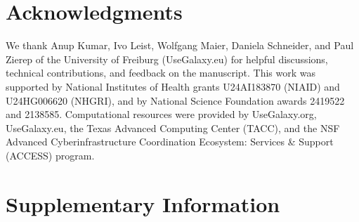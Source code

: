 \documentclass[11pt,letterpaper]{article}
\begin{document}
\section*{Acknowledgments}
We thank Anup Kumar, Ivo Leist, Wolfgang Maier, Daniela Schneider, and Paul Zierep of the University of Freiburg (UseGalaxy.eu) for helpful discussions, technical contributions, and feedback on the manuscript. This work was supported by National Institutes of Health grants U24AI183870 (NIAID) and U24HG006620 (NHGRI), and by National Science Foundation awards 2419522 and 2138585. Computational resources were provided by UseGalaxy.org, UseGalaxy.eu, the Texas Advanced Computing Center (TACC), and the NSF Advanced Cyberinfrastructure Coordination Ecosystem: Services \& Support (ACCESS) program.




\clearpage
\appendix
\renewcommand{\thetable}{S\arabic{table}}
\renewcommand{\theHtable}{S\arabic{table}}
\setcounter{table}{0}

\section*{Supplementary Information}
\end{document}
